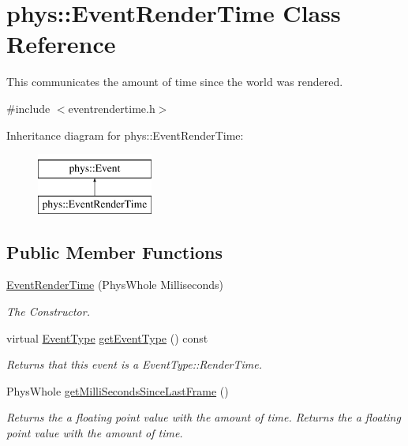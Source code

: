 \hypertarget{classphys_1_1EventRenderTime}{
\section{phys::EventRenderTime Class Reference}
\label{d3/d8b/classphys_1_1EventRenderTime}
}


This communicates the amount of time since the world was rendered.  




{\ttfamily \#include $<$eventrendertime.h$>$}

Inheritance diagram for phys::EventRenderTime:\begin{figure}[H]
\begin{center}
\leavevmode
\includegraphics[height=2cm]{d3/d8b/classphys_1_1EventRenderTime}
\end{center}
\end{figure}
\subsection*{Public Member Functions}
\begin{DoxyCompactItemize}
\item 
\hyperlink{classphys_1_1EventRenderTime_ac3c025af82c0a31369c0b6de28d7cab1}{EventRenderTime} (PhysWhole Milliseconds)
\begin{DoxyCompactList}\small\item\em The Constructor. \item\end{DoxyCompactList}\item 
virtual \hyperlink{classphys_1_1Event_af5fdbb3e08d8e578d58770fbc606fda7}{EventType} \hyperlink{classphys_1_1EventRenderTime_a66918bf3793196899621e4442a6f7a57}{getEventType} () const 
\begin{DoxyCompactList}\small\item\em Returns that this event is a EventType::RenderTime. \item\end{DoxyCompactList}\item 
PhysWhole \hyperlink{classphys_1_1EventRenderTime_a1aa4e9d58140b2d1d4c52fdb0f74662f}{getMilliSecondsSinceLastFrame} ()
\begin{DoxyCompactList}\small\item\em Returns the a floating point value with the amount of time.  Returns the a floating point value with the amount of time. \item\end{DoxyCompactList}\end{DoxyCompactItemize}


